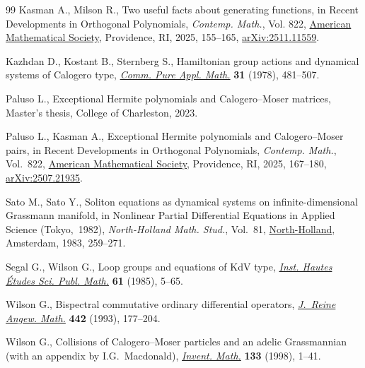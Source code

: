 \documentclass[pdftex]{sigma}
\numberwithin{equation}{section}
\theoremstyle{definition}
\begin{document}
\begin{thebibliography}{99}
Kasman A., Milson R., Two useful facts about generating functions, in Recent
 {D}evelopments in {O}rthogonal {P}olynomials, \textit{Contemp. Math.}, Vol.
 822, \href{https://doi.org/10.1090/conm/822/16476}{American Mathematical
 Society}, Providence, RI, 2025, 155--165,
 \href{http://arxiv.org/abs/2511.11559}{arXiv:2511.11559}.

Kazhdan D., Kostant B., Sternberg S., Hamiltonian group actions and dynamical
 systems of {C}alogero type,
 \href{https://doi.org/10.1002/cpa.3160310405}{\textit{Comm. Pure Appl.
 Math.}} \textbf{31} (1978), 481--507.

Paluso L., Exceptional {H}ermite polynomials and {C}alogero--{M}oser matrices,
 {M}aster's thesis, {C}ollege of Charleston, 2023.

Paluso L., Kasman A., Exceptional {H}ermite polynomials and {C}alogero--{M}oser
 pairs, in Recent {D}evelopments in {O}rthogonal {P}olynomials,
 \textit{Contemp. Math.}, Vol.~822,
 \href{https://doi.org/10.1090/conm/822/16481}{American Mathematical Society},
 Providence, RI, 2025, 167--180,
 \href{http://arxiv.org/abs/2507.21935}{arXiv:2507.21935}.

Sato M., Sato Y., Soliton equations as dynamical systems on
 infinite-dimensional {G}rassmann manifold, in Nonlinear {P}artial
 {D}ifferential {E}quations in {A}pplied {S}cience ({T}okyo,~1982),
 \textit{North-Holland Math. Stud.}, Vol.~81,
 \href{https://doi.org/10.1016/S0304-0208(08)72096-6}{North-Holland},
 Amsterdam, 1983, 259--271.

Segal G., Wilson G., Loop groups and equations of {K}d{V} type,
 \href{https://doi.org/10.1007/BF02698802}{\textit{Inst. Hautes \'{E}tudes
 Sci. Publ. Math.}} \textbf{61} (1985), 5--65.

Wilson G., Bispectral commutative ordinary differential operators,
 \href{https://doi.org/10.1515/crll.1993.442.177}{\textit{J.~Reine Angew.
 Math.}} \textbf{442} (1993), 177--204.

Wilson G., Collisions of {C}alogero--{M}oser particles and an adelic
 {G}rassmannian (with an appendix by I.G.~Macdonald),
 \href{https://doi.org/10.1007/s002220050237}{\textit{Invent. Math.}}
 \textbf{133} (1998), 1--41.

\end{thebibliography}\LastPageEnding
\end{document}
